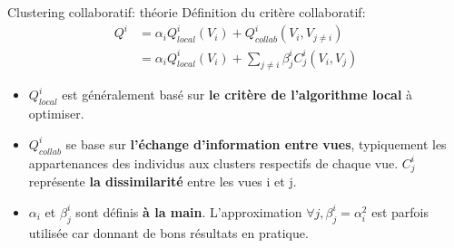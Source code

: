 \documentclass[hyperref={pdfpagelabels=false}]{beamer}
\begin{document}

    \begin{frame}{Clustering collaboratif: théorie}
        Définition du critère collaboratif:
        \begin{align*}
            Q^i &= \alpha_i Q^i_{local}(V_i) + Q^i_{collab}(V_i, V_{j\neq i})\\
            &= \alpha_i Q^i_{local}(V_i) + \sum_{j\neq i} \beta^i_j C_j^i(V_i, 
            V_j)
        \end{align*}
        \begin{itemize}
            \item $Q^i_{local}$ est généralement basé sur \textbf{le critère de 
                l'algorithme local} à optimiser.
            \item $Q^i_{collab}$ se base sur \textbf{l'échange d'information 
                entre vues}, typiquement les appartenances des individus aux 
                clusters respectifs de chaque vue. $C_j^i$ représente \textbf{la 
                dissimilarité} entre les vues i et j.
            \item $\alpha_i$ et $\beta_j^i$ sont définis \textbf{à la main}.  
                L'approximation $\forall j, \beta_j^i = \alpha_i^2$ est parfois 
                utilisée car donnant de bons résultats en pratique.
        \end{itemize}
    \end{frame}
\end{document}
